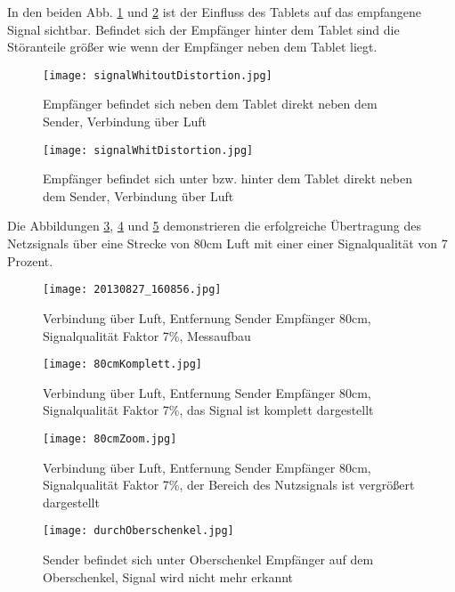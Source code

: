 \documentclass[10pt]{article}
\begin{document}
\clearpage
\newpage

In den beiden Abb. \ref{img:KeineStörungenVomTablet} und \ref{img:StörungenVomTablet} ist der Einfluss des Tablets auf das empfangene Signal sichtbar. Befindet sich der Empfänger hinter dem Tablet sind die Störanteile größer wie wenn der Empfänger neben dem Tablet liegt.
\begin{figure}[h!]
	\centering
	\texttt{[image: signalWhitoutDistortion.jpg]}
	\caption{Empfänger befindet sich neben dem Tablet direkt neben dem Sender, Verbindung über Luft}
	\label{img:KeineStörungenVomTablet}
\end{figure}

\begin{figure}[h!]
	\centering
	\texttt{[image: signalWhitDistortion.jpg]}
	\caption{Empfänger befindet sich unter bzw. hinter dem Tablet direkt neben dem Sender, Verbindung über Luft}
	\label{img:StörungenVomTablet}
\end{figure}

\clearpage
\newpage

Die Abbildungen \ref{img:Messaufbau}, \ref{img:KomplettSignal} und \ref{img:NutzsignalVergroessert} demonstrieren die erfolgreiche Übertragung des Netzsignals über eine Strecke von 80cm Luft mit einer einer Signalqualität von 7 Prozent.

\begin{figure}[h!]
	\centering
	\texttt{[image: 20130827\_160856.jpg]}
	\caption{Verbindung über Luft, Entfernung Sender Empfänger 80cm, Signalqualität Faktor 7\%, Messaufbau}
	\label{img:Messaufbau}
\end{figure}

\begin{figure}[h!]
	\centering
	\texttt{[image: 80cmKomplett.jpg]}
	\caption{Verbindung über Luft, Entfernung Sender Empfänger 80cm, Signalqualität Faktor 7\%, das Signal ist komplett dargestellt}
	\label{img:KomplettSignal}
\end{figure}

\begin{figure}[h!]
	\centering
	\texttt{[image: 80cmZoom.jpg]}
	\caption{Verbindung über Luft, Entfernung Sender Empfänger 80cm, Signalqualität Faktor 7\%, der Bereich des Nutzsignals ist vergrößert dargestellt}
	\label{img:NutzsignalVergroessert}
\end{figure}

\begin{figure}[h!]
	\centering
	\texttt{[image: durchOberschenkel.jpg]}
	\caption{Sender befindet sich unter Oberschenkel Empfänger auf dem Oberschenkel, Signal wird nicht mehr erkannt}
	\label{img:Oberschenkel}
\end{figure}
\end{document}
